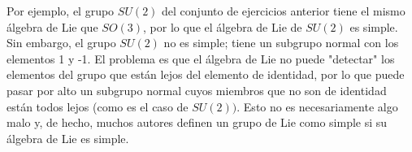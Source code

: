 \documentclass[11pt]{book}
\numberwithin{equation}{section}
\theoremstyle{plain}  %
\begin{document}
\begin{itemize}
Por ejemplo, el grupo $SU(2)$ del conjunto de ejercicios
anterior tiene el mismo álgebra de Lie que $SO(3)$, por lo que
el álgebra de Lie de $SU(2)$ es simple. Sin embargo, el grupo
$SU(2)$ no es simple; tiene un subgrupo normal con los
elementos 
1 y -1.
El problema es que el álgebra de Lie no
puede "detectar" los elementos del grupo que están lejos del
elemento de identidad, por lo que puede pasar por alto un
subgrupo normal cuyos miembros que no son de identidad están
todos lejos (como es el caso de $SU(2))$. Esto no es
necesariamente algo malo y, de hecho, muchos autores definen
un grupo de Lie como simple si su álgebra de Lie es simple.

\end{itemize}
\end{document}
